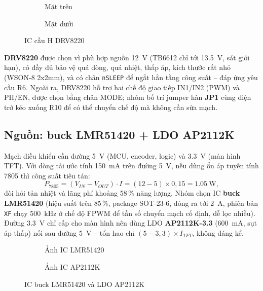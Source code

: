 \begin{figure}[H]
\centering
\begin{subfigure}{0.49\linewidth}\centering{}\caption{Mặt trên}\end{subfigure}
\hfill
\begin{subfigure}{0.49\linewidth}\centering{}\caption{Mặt dưới}\end{subfigure}
\caption{IC cầu H DRV8220}
\label{fig:drv8220}
\end{figure}

\textbf{DRV8220} được chọn vì phù hợp nguồn \SI{12}{\volt} (TB6612 chỉ tới \SI{13.5}{\volt}, sát giới hạn), có đầy đủ bảo vệ quá dòng, quá nhiệt, thấp áp, kích thước rất nhỏ (WSON-8 2x2mm), và có chân \texttt{nSLEEP} để ngắt hẳn tầng công suất -- đáp ứng yêu cầu R6. Ngoài ra, DRV8220 hỗ trợ hai chế độ giao tiếp IN1/IN2 (PWM) và PH/EN, được chọn bằng chân MODE; nhóm bố trí jumper hàn \textbf{JP1} cùng điện trở kéo xuống R10 để có thể chuyển chế độ mà không cần sửa mạch.

\subsection{Nguồn: buck LMR51420 + LDO AP2112K}
Mạch điều khiển cần đường \SI{5}{\volt} (MCU, encoder, logic) và \SI{3.3}{\volt} (màn hình TFT). Với dòng tải ước tính \SI{150}{\milli\ampere} trên đường \SI{5}{\volt}, nếu dùng ổn áp tuyến tính 7805 thì công suất tiêu tán:
\begin{equation}
  P_{7805}=(V_{IN}-V_{OUT})\cdot I=(12-5)\times0{,}15=\SI{1.05}{\watt},
\end{equation}
đòi hỏi tản nhiệt và lãng phí khoảng 58\,\% năng lượng. Nhóm chọn IC \textbf{buck LMR51420} (hiệu suất trên 85\,\%, package SOT-23-6, dòng ra tới \SI{2}{\ampere}, phiên bản \texttt{XF} chạy \SI{500}{\kilo\hertz} ở chế độ FPWM để tần số chuyển mạch cố định, dễ lọc nhiễu). Đường \SI{3.3}{\volt} chỉ cấp cho màn hình nên dùng LDO \textbf{AP2112K-3.3} (\SI{600}{\milli\ampere}, sụt áp thấp) nối sau đường \SI{5}{\volt} -- tổn hao chỉ $(5-3{,}3)\times I_{TFT}$, không đáng kể.

\begin{figure}[H]
\centering
\begin{subfigure}{0.49\linewidth}\centering{}\caption{Ảnh IC LMR51420}\end{subfigure}
\hfill
\begin{subfigure}{0.49\linewidth}\centering{}\caption{Ảnh IC AP2112K}\end{subfigure}
\caption{IC buck LMR51420 và LDO AP2112K}
\label{fig:lmr51420_ap2112k}
\end{figure}


